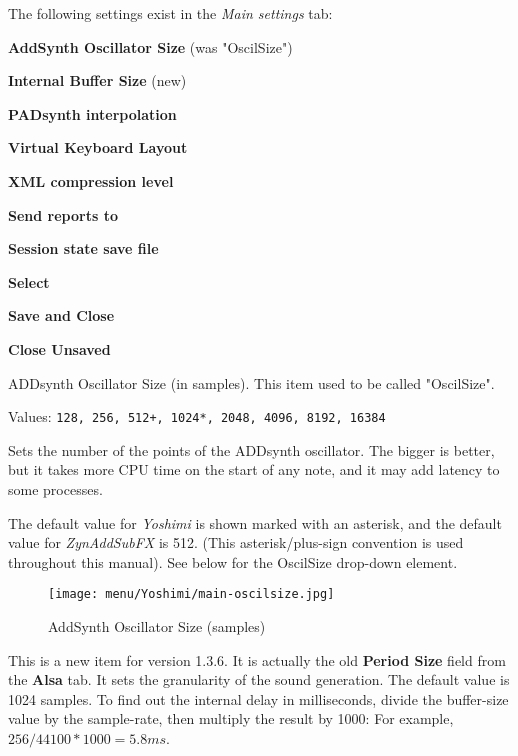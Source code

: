    The following settings exist in the \textsl{Main settings} tab:

   \begin{enumber}
      \item \textbf{AddSynth Oscillator Size} (was "OscilSize")
      \item \textbf{Internal Buffer Size} (new)
      \item \textbf{PADsynth interpolation}
      \item \textbf{Virtual Keyboard Layout}
      \item \textbf{XML compression level}
      \item \textbf{Send reports to}
      \item \textbf{Session state save file}
      \item \textbf{Select}
      \item \textbf{Save and Close}
      \item \textbf{Close Unsaved}
   \end{enumber}

   \setcounter{ItemCounter}{0}      %

   ADDsynth Oscillator Size (in samples).  This item used to be called
   "OscilSize".

   Values: \texttt{128, 256, 512+, 1024*, 2048, 4096, 8192, 16384}

   Sets the number of the points of the ADDsynth oscillator. The
   bigger is better, but it takes more CPU time on the start of any note,
   and it may add latency to some processes.

   The default value for \textsl{Yoshimi} is shown marked with an asterisk,
   and the default value for \textsl{ZynAddSubFX} is 512.
   (This asterisk/plus-sign convention is used throughout this manual).
   See  below for the OscilSize
   drop-down element.

\begin{figure}[H]
   \centering 
   \texttt{[image: menu/Yoshimi/main-oscilsize.jpg]}
   \caption[OscilSize Values]{AddSynth Oscillator Size (samples)}
   \label{fig:yoshimi_oscilsize_values}
\end{figure}

   This is a new item for version 1.3.6.  It is actually the old
   \textbf{Period Size} field from the \textbf{Alsa} tab.
   It sets the granularity of the sound generation.
   The default value is 1024 samples.
   To find out the internal delay in milliseconds, divide the
   buffer-size value by the sample-rate, then multiply the result by 1000:
   For example, \(256 / 44100 * 1000 = 5.8 ms\).

